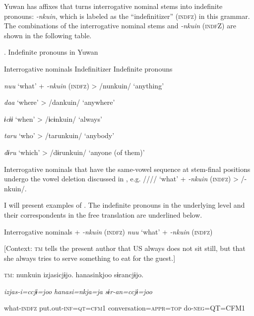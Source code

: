 Yuwan has affixes that turns interrogative nominal stems into indefinite pronouns: \textit{{}-nkuin}, which is labeled as the “indefinitizer” (\textsc{indfz}) in this grammar. The combinations of the interrogative nominal stems and \textit{-nkuin} (\textsc{indf}Z) are shown in the following table.

\begin{styleBeschriftung}
\textmd{}\textmd{. Indefinite pronouns in Yuwan}
\end{styleBeschriftung}

Interrogative nominals    Indefinitizer    Indefinite pronouns

\textit{nuu}  ‘what’  +  \textit{{}-nkuin} (\textsc{indfz})  >  /nunkuin/  ‘anything’

\textit{daa}  ‘where’      >  /dankuin/  ‘anywhere’

\textit{ɨcɨɨ}  ‘when’      >  /ɨcɨnkuin/  ‘always’

\textit{taru}  ‘who’      >  /tarunkuin/  ‘anybody’

\textit{dɨru}  ‘which’      >  /dɨrunkuin/  ‘anyone (of them)’

Interrogative nominals that have the same-vowel sequence at stem-final positions undergo the vowel deletion discussed in , e.g. //// ‘what’ + \textit{{}-nkuin} (\textsc{indfz}) > /-nkuin/.

  I will present examples of . The indefinite pronouns in the underlying level and their correspondents in the free translation are underlined below.

\ea \label{ex:7:22}  Interrogative nominals + \textit{{}-nkuin} (\textsc{indfz})
\ea \label{ex:7:22a}\textit{nuu} ‘what’ + \textit{{}-nkuin} (\textsc{indfz})

    [Context: \textsc{tm} tells the present author that US always does not sit still, but that she always tries to serve something to eat for the guest.]

    \textsc{tm}:  nunkuin  izjasicjɨjo.  hanasinkjoo  sɨrancjɨjo.

      \textit{}  \textit{izjas-i=ccjɨ=joo}  \textit{hanasi=nkja=ja}  \textit{sɨr-an=ccjɨ=joo}
                                                                             
      what-\textsc{indfz}  put.out-\textsc{inf}=\textsc{qt}=\textsc{cfm}1  conversation=\textsc{appr}=\textsc{top}                  do-\textsc{neg}=QT=CFM1

